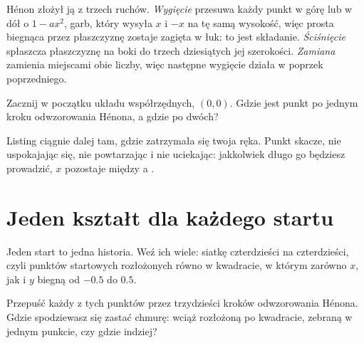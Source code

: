 Hénon złożył ją z trzech ruchów. \emph{Wygięcie} przesuwa każdy punkt w górę
lub w dół o $1 - a x^{2}$, garb, który wysyła $x$ i $-x$ na tę samą wysokość,
więc prosta biegnąca przez płaszczyznę zostaje zagięta w łuk: to jest
składanie. \emph{Ściśnięcie} spłaszcza płaszczyznę na boki do trzech
dziesiątych jej szerokości. \emph{Zamiana} zamienia miejscami obie liczby,
więc następne wygięcie działa w poprzek poprzedniego.

\begin{think}
Zacznij w początku układu współrzędnych, $(0, 0)$. Gdzie jest punkt po
jednym kroku odwzorowania Hénona, a gdzie po dwóch?
\end{think}



\noindent
Listing ciągnie dalej tam, gdzie zatrzymała się twoja ręka. Punkt skacze, nie
uspokajając się, nie powtarzając i nie uciekając: jakkolwiek długo go
będziesz prowadzić, $x$ pozostaje między  a
.

\section{Jeden kształt dla każdego startu}
\label{sec:ch10-cloud}

\noindent
Jeden start to jedna historia. Weź ich wiele: siatkę czterdzieści na
czterdzieści, czyli  punktów startowych rozłożonych równo
w kwadracie, w którym zarówno $x$, jak i $y$ biegną od $-\num{0.5}$ do
$\num{0.5}$.

\begin{think}
Przepuść każdy z tych punktów przez trzydzieści kroków odwzorowania Hénona.
Gdzie spodziewasz się zastać chmurę: wciąż rozłożoną po kwadracie, zebraną w
jednym punkcie, czy gdzie indziej?
\end{think}

